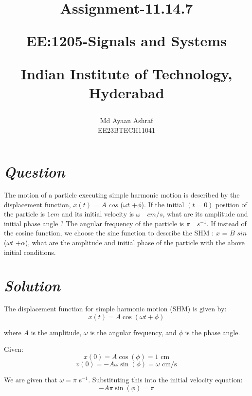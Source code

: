 \documentclass[journal,12pt,twocolumn]{IEEEtran}
\theoremstyle{remark}
\begin{document}
%




\vspace{3cm}

\title{
Assignment-11.14.7 

\large{EE:1205-Signals and Systems}

Indian Institute of Technology, Hyderabad
}
\author{Md Ayaan Ashraf

EE23BTECH11041
}	

\maketitle

\newpage


\bigskip

\renewcommand{\thefigure}{\theenumi}
\renewcommand{\thetable}{\theenumi}
\section*{\textbf{\textit{Question}}}
The motion of a particle executing simple harmonic motion is described by the
displacement function, $x(t)$ = $A$ $cos$ ($\omega$$t$ +$\phi$).
If the initial $(t = 0)$ position of the particle is $1 cm$ and its initial velocity is $\omega\quad cm/s$, what are its amplitude and initial phase angle ? The angular frequency of the particle is $\pi\quad s^{-1}$. If instead of the cosine function, we choose the sine function to describe the SHM : $x$ = $B$ $sin$ ($\omega$$t$ +$\alpha$), what are the amplitude and initial phase of the
particle with the above initial conditions.
\section*{\textit{\textbf{Solution}}}

The displacement function for simple harmonic motion (SHM) is given by:
\[ x(t) = A \cos(\omega t + \phi) \]

where \(A\) is the amplitude, \(\omega\) is the angular frequency, and \(\phi\) is the phase angle.

Given:
\[ x(0) = A \cos(\phi) = 1 \text{ cm} \]
\[ v(0) = -A \omega \sin(\phi) = \omega \text{ cm/s} \]

We are given that \(\omega = \pi\) s\(^{-1}\). Substituting this into the initial velocity equation:
\[ -A \pi \sin(\phi) = \pi \]
\end{document}
